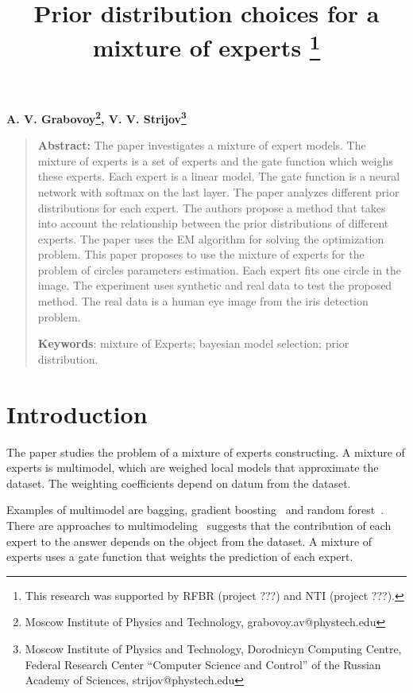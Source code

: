 \documentclass[12pt, twoside]{article}
\begin{document}
\title{\bf Prior distribution choices for a mixture of experts \thanks{This research was supported by RFBR (project ???) and NTI (project ???).}}
\date{}
\author{}
\maketitle

\begin{center}
\bf
A. V. Grabovoy\footnote{Moscow Institute of Physics and Technology, grabovoy.av@phystech.edu},
V. V. Strijov\footnote{Moscow Institute of Physics and Technology, Dorodnicyn Computing Centre, Federal Research Center “Computer Science and Control” of the Russian Academy of Sciences, strijov@phystech.edu}
\end{center}
{\centering\begin{quote}
\textbf{Abstract:} 
The paper investigates a mixture of expert models. 
The mixture of experts is a set of experts and the gate function which weighs these experts. Each expert is a linear model.
The gate function is a neural network with softmax on the last layer. 
The paper analyzes different prior distributions for each expert.
The authors propose a method that takes into account the relationship between the prior distributions of different experts.
The paper uses the EM algorithm for solving the optimization problem.
This paper proposes to use the mixture of experts for the problem of circles parameters estimation.
Each expert fits one circle in the image.
The experiment uses synthetic and real data to test the proposed method.
The real data is a human eye image from the iris detection problem.


\smallskip
\textbf{Keywords}: mixture of Experts; bayesian model selection; prior distribution.

\smallskip
\end{quote}
}

\section{Introduction}
The paper studies the problem of a mixture of experts constructing. A mixture of experts is multimodel, which are weighed local models that approximate the dataset. The weighting coefficients depend on datum from the dataset.

Examples of multimodel are bagging, gradient boosting~\cite{Tianqi2016} and random forest~\cite{Ishwaran2012}. There are approaches to multimodeling~\cite{Yuksel2012} suggests that the contribution of each expert to the answer depends on the object from the dataset. A mixture of experts uses a gate function that weights the prediction of each expert.
\end{document}
